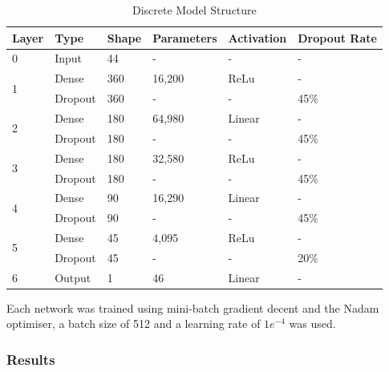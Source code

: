 \begin{table}[!h]
    \centering
    \caption{Discrete Model Structure}
    \begin{tabular}[b]{l l l l l l }
        \textbf{Layer} & \textbf{Type} & \textbf{Shape} & \textbf{Parameters} & \textbf{Activation} & \textbf{Dropout Rate} \\
        \hline
        0 & Input & 44 & - & - & - \\
        \hline
        \multirow[t]{2}{*}{1} & Dense & 360 & 16,200 & ReLu  & - \\ \cline{2-6}
        
                & Dropout & 360 & - & - & 45\% \\
        \hline
        \multirow[t]{2}{*}{2} & Dense & 180 & 64,980 & Linear  & - \\ \cline{2-6}
        
        & Dropout & 180 & - & - & 45\% \\
        \hline
        \multirow[t]{2}{*}{3} & Dense & 180 & 32,580 & ReLu  & - \\ \cline{2-6}
        
        & Dropout & 180 & - & - & 45\% \\
        \hline
        \multirow[t]{2}{*}{4} & Dense & 90 & 16,290 & Linear  & - \\ \cline{2-6}
        
        & Dropout & 90 & - & - & 45\% \\
        \hline
        \multirow[t]{2}{*}{5} & Dense & 45 & 4,095 & ReLu  & - \\ \cline{2-6}
        
        & Dropout & 45 & - & - & 20\% \\
        \hline
        6 & Output & 1 & 46 & Linear & - \\
        \hline
    \end{tabular}
    \label{tab:discrete_model_struct}
\end{table}

Each network was trained using mini-batch gradient decent and the Nadam optimiser, a batch size of 512 and a learning rate of $1e^{-4}$ was used.


\FloatBarrier
\subsubsection{Results}

